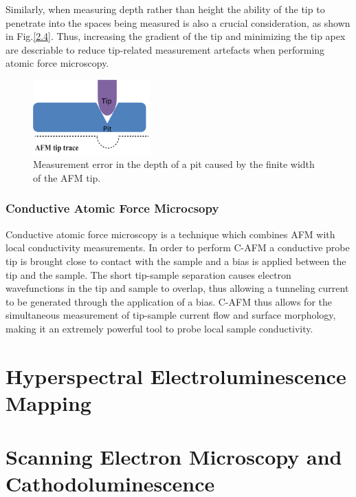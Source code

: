 Similarly, when measuring depth rather than height the ability of the tip to penetrate into the spaces being measured is also a crucial consideration, as shown in Fig.\ref{2.4}. Thus, increasing the gradient of the tip and minimizing the tip apex are descriable to reduce tip-related measurement artefacts when performing atomic force microscopy.

\begin{figure}[h]
	\centering
	\includegraphics[width=0.4\textwidth]{Figs/Ch2/afm3.png}
	\caption {Measurement error in the depth of a pit caused by the finite width of the AFM tip.}
\end{figure}
\FloatBarrier

\subsubsection{Conductive Atomic Force Microcsopy}

Conductive atomic force microscopy  is a technique which combines AFM with local conductivity measurements. In order to perform C-AFM a conductive probe tip is brought close to contact with the sample and a bias is applied between the tip and the sample. The short tip-sample separation causes electron wavefunctions in the tip and sample to overlap, thus allowing a tunneling current to be generated through the application of a bias. C-AFM thus allows for the simultaneous measurement of tip-sample current flow and surface morphology, making it an extremely powerful tool to probe local sample conductivity. 



\section{Hyperspectral Electroluminescence Mapping}
\section{Scanning Electron Microscopy and Cathodoluminescence}
